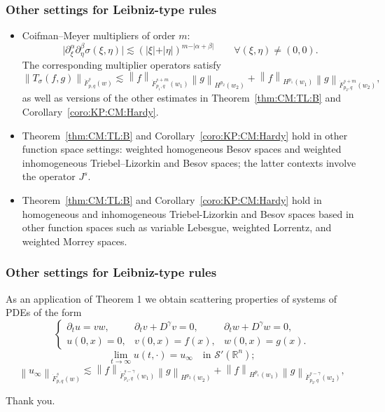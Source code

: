 \documentclass[xcolor=dvipsnames]{beamer}
\newcommand{\rn}{{{\mathbb R}^n}}
\newcommand{\abs}[1]{\vert #1 \vert}
\newcommand{\norm}[2]{{\left\| #1 \right\|}_{#2}}
\newcommand{\swp}{{\mathcal{S}'}(\rn)}
\newcommand{\tlw}[4]{\dot F_{#1,#3}^{#2}(#4)} %
\begin{document}
\begin{frame}\frametitle{Other settings for Leibniz-type rules}

\begin{itemize}
\item Coifman--Meyer multipliers of order $m:$
\begin{equation*}
\abs{\partial_\xi^\alpha\partial_\eta^\beta\sigma(\xi,\eta)}\lesssim (\abs{\xi}+\abs{\eta})^{m-\abs{\alpha+\beta}} \quad \quad \forall (\xi,\eta)\neq(0,0).
\end{equation*}
The corresponding multiplier operators satisfy
\begin{equation*}
\norm{T_\sigma(f,g)}{\tlw{p}{s}{q}{w}} \lesssim \norm{f}{\tlw{p_1}{s+m}{q}{w_1} } \norm{g}{H^{p_2}(w_2)} +  \norm{f}{H^{p_1}(w_1)}   \norm{g}{\tlw{p_2}{s+m}{q}{w_2} },
\end{equation*}
as well as versions of the other estimates in Theorem~\ref{thm:CM:TL:B} and Corollary~\ref{coro:KP:CM:Hardy}.

\bigskip

\item Theorem~\ref{thm:CM:TL:B} and Corollary~\ref{coro:KP:CM:Hardy} hold in other function space settings: weighted homogeneous Besov spaces and weighted inhomogeneous Triebel--Lizorkin and Besov spaces; the latter contexts involve the operator $J^s.$

\bigskip
\item Theorem~\ref{thm:CM:TL:B} and Corollary~\ref{coro:KP:CM:Hardy} hold in homogeneous and inhomogeneous Triebel-Lizorkin and Besov spaces based in other function spaces such as variable Lebesgue, weighted Lorrentz, and weighted Morrey spaces. 

\end{itemize}
\end{frame}

\begin{frame}\frametitle{Other settings for Leibniz-type rules}
As an application of Theorem 1 we obtain scattering properties of systems of PDEs of the form
\begin{equation*}\label{eq:Ds:Ds}
\left\{ \begin{array}{lll}  \partial_t u =vw, & \partial_t v +D^\gamma v = 0, & \partial_t w + D^\gamma w = 0, \\
  u(0,x)=0,&v(0,x)=f(x),&w(0,x) = g(x).
 \end{array} \right.
\end{equation*}
\begin{equation*}\label{def:u:infty}
\lim\limits_{t \to \infty} u(t, \cdot ) = u_\infty \quad \text{in } \swp;
\end{equation*}
\begin{equation*}\label{eq:scattering1}
\norm{u_\infty}{\tlw{p}{s}{q}{w}} \lesssim \norm{f}{\tlw{p_1}{s-\gamma}{q}{w_1} } \norm{g}{H^{p_2}(w_2)} +  \norm{f}{H^{p_1}(w_1)}   \norm{g}{\tlw{p_2}{s-\gamma}{q}{w_2} },
\end{equation*}

\end{frame}

\begin{frame}
Thank you.
\end{frame}
\end{document}
